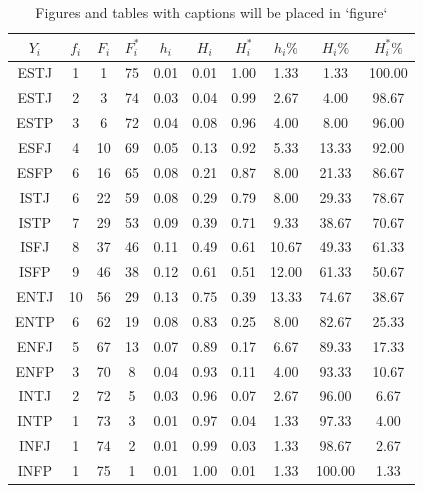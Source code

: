 \documentclass[
  10pt,
]{krantz}
\theoremstyle{definition}
\theoremstyle{definition}
\theoremstyle{definition}
\theoremstyle{definition}
\theoremstyle{remark}
\begin{document}
\begin{longtable}[t]{cccccccccc}
\caption{\label{tab:2w3}Figures and tables with captions will be placed in `figure` }\\
\toprule
$Y_i$ & $f_i$ & $F_i$ & $F_i^*$ & $h_i$ & $H_i$ & $H_i^*$ & $h_i\%$ & $H_i\%$ & $H_i^*\%$\\
\midrule
ESTJ & 1 & 1 & 75 & 0.01 & 0.01 & 1.00 & 1.33 & 1.33 & 100.00\\
ESTJ & 2 & 3 & 74 & 0.03 & 0.04 & 0.99 & 2.67 & 4.00 & 98.67\\
ESTP & 3 & 6 & 72 & 0.04 & 0.08 & 0.96 & 4.00 & 8.00 & 96.00\\
ESFJ & 4 & 10 & 69 & 0.05 & 0.13 & 0.92 & 5.33 & 13.33 & 92.00\\
ESFP & 6 & 16 & 65 & 0.08 & 0.21 & 0.87 & 8.00 & 21.33 & 86.67\\
ISTJ & 6 & 22 & 59 & 0.08 & 0.29 & 0.79 & 8.00 & 29.33 & 78.67\\
ISTP & 7 & 29 & 53 & 0.09 & 0.39 & 0.71 & 9.33 & 38.67 & 70.67\\
ISFJ & 8 & 37 & 46 & 0.11 & 0.49 & 0.61 & 10.67 & 49.33 & 61.33\\
ISFP & 9 & 46 & 38 & 0.12 & 0.61 & 0.51 & 12.00 & 61.33 & 50.67\\
ENTJ & 10 & 56 & 29 & 0.13 & 0.75 & 0.39 & 13.33 & 74.67 & 38.67\\
ENTP & 6 & 62 & 19 & 0.08 & 0.83 & 0.25 & 8.00 & 82.67 & 25.33\\
ENFJ & 5 & 67 & 13 & 0.07 & 0.89 & 0.17 & 6.67 & 89.33 & 17.33\\
ENFP & 3 & 70 & 8 & 0.04 & 0.93 & 0.11 & 4.00 & 93.33 & 10.67\\
INTJ & 2 & 72 & 5 & 0.03 & 0.96 & 0.07 & 2.67 & 96.00 & 6.67\\
INTP & 1 & 73 & 3 & 0.01 & 0.97 & 0.04 & 1.33 & 97.33 & 4.00\\
INFJ & 1 & 74 & 2 & 0.01 & 0.99 & 0.03 & 1.33 & 98.67 & 2.67\\
INFP & 1 & 75 & 1 & 0.01 & 1.00 & 0.01 & 1.33 & 100.00 & 1.33\\
\bottomrule
\end{longtable}
\end{document}
